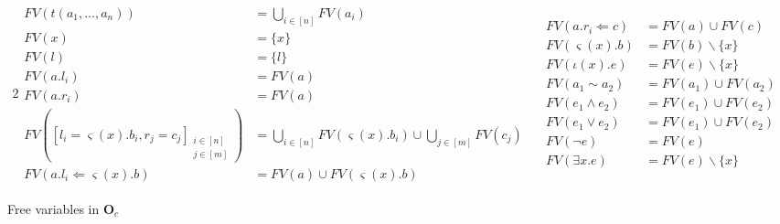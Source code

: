 \begin{figure*}[h]
  \centering
  \begin{alignat*}{2}
    \begin{aligned}
      FV(t(a_1 , \ldots , a_n)) & = \bigcup_{i \in [n]} FV(a_i)\\
      FV(x) & = \{x\}\\
      FV(l) & = \{l\}\\
      FV(a.l_i) & = FV(a)\\
      FV(a.r_i) & = FV(a)\\
      FV([l_i = \varsigma(x) . b_i , r_j = c_j]_{\substack{i \in [n]\\j \in [m]}})
      & = \bigcup_{i \in [n]} FV(\varsigma(x) . b_i) \cup \bigcup_{j \in [m]} FV(c_j)\\
      FV(a.l_i \Leftarrow \varsigma(x) . b) & = FV(a) \cup FV(\varsigma(x) . b)
    \end{aligned}
    \quad
    \begin{aligned}
      FV(a.r_i \Leftarrow c) & = FV(a) \cup FV(c)\\
      FV(\varsigma(x) . b) & = FV(b) \backslash \{x\}\\
      FV(\iota (x) . e) & = FV(e) \backslash \{x\}\\
      FV(a_1 \sim a_2) & = FV(a_1) \cup FV(a_2)\\
      FV(e_1 \land e_2) & = FV (e_1) \cup FV(e_2)\\
      FV(e_1 \vee e_2) & = FV (e_1) \cup FV(e_2)\\
      FV(\neg e) & = FV (e)\\
      FV(\exists x . e) & = FV(e) \backslash \{x\}
    \end{aligned}
  \end{alignat*}
  \caption{Free variables in $\textbf{O}_c$}
  \label{Oc:fv}
\end{figure*}

